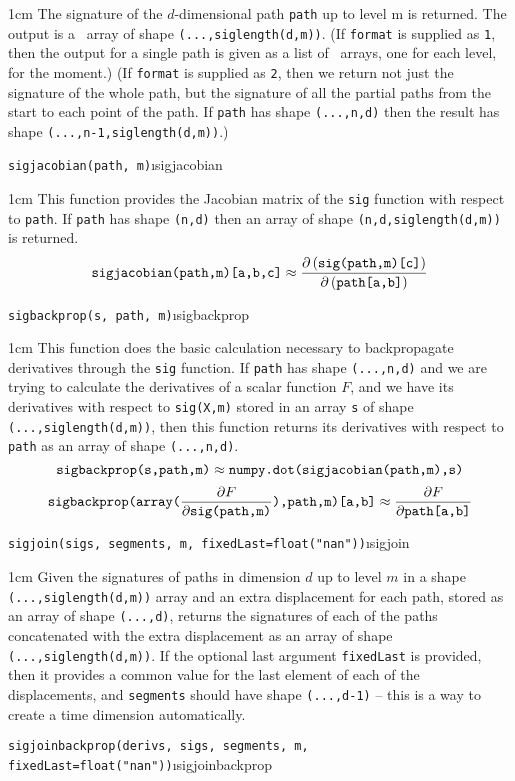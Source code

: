 \documentclass[a4paper]{extarticle}
\newenvironment{defn}{\begin{adjustwidth}{1cm}{}\ignorespaces}{\end{adjustwidth}\ignorespacesafterend}
\begin{document}
\begin{defn}
\nopagebreak The signature of the $d$-dimensional path \verb|path| up to level m is returned. The output is a \numpy\ array of shape \verb!(...,siglength(d,m))!.
(If \verb|format| is supplied as \verb!1!, then the output for a single path is given as a list of \numpy\ arrays, one for each level, for the moment.) 
(If \verb|format| is supplied as \verb|2|, then we return not just the signature of the whole path, but the signature of all the partial paths from the start to each point of the path. 
If \verb|path| has shape \verb|(...,n,d)| then the result has shape \verb|(...,n-1,siglength(d,m))|.)
\end{defn}
\newpage
\verb!sigjacobian(path, m)!\i{sigjacobian}
\begin{defn}
\nopagebreak This function provides the Jacobian matrix of the \verb|sig| function with respect to \verb|path|. If \verb|path| has shape \verb|(n,d)| then an array of shape \verb!(n,d,siglength(d,m))! is returned. 
\[\verb|sigjacobian(path,m)[a,b,c]|
 \approx
  {\partial\,(\verb|sig(path,m)[c]|) \over 
  \partial\,(\verb|path[a,b]|)}
 \]
\end{defn}
\verb!sigbackprop(s, path, m)!\i{sigbackprop}

\begin{defn}
\nopagebreak This function does the basic calculation necessary to backpropagate derivatives through the \verb|sig| function. If \verb|path| has shape \verb|(...,n,d)| and we are trying to calculate the derivatives of a scalar function $F$, and we have its derivatives with respect to \verb|sig(X,m)| stored in an array \verb|s| of shape \verb|(...,siglength(d,m))|, then this function returns its derivatives with respect to \verb|path| as an array of shape \verb|(...,n,d)|.
\[\verb|sigbackprop(s,path,m)|
 \approx
  \verb|numpy.dot(sigjacobian(path,m),s)|
 \]
\[\verb|sigbackprop(array(|{\partial F \over \partial \verb|sig(path,m)|}\verb|),path,m)[a,b]| \approx {\partial F \over \partial \verb|path[a,b]|}
 \]
\end{defn}
\verb!sigjoin(sigs, segments, m, fixedLast=float("nan"))!\i{sigjoin}

\begin{defn}
\nopagebreak Given the signatures of paths in dimension $d$ up to level $m$ in a shape \verb|(...,siglength(d,m))| array and an extra displacement for each path, stored as an array of shape \verb|(...,d)|, returns the signatures of each of the paths concatenated with the extra displacement as an array of shape \verb|(...,siglength(d,m))|. If the optional last argument \verb|fixedLast| is provided, then it provides a common value for the last element of each of the displacements, and \verb|segments| should have shape \verb|(...,d-1)| -- this is a way to create a time dimension automatically.
\end{defn}
\verb!sigjoinbackprop(derivs, sigs, segments, m, fixedLast=float("nan"))!\i{sigjoinbackprop}
\end{document}
